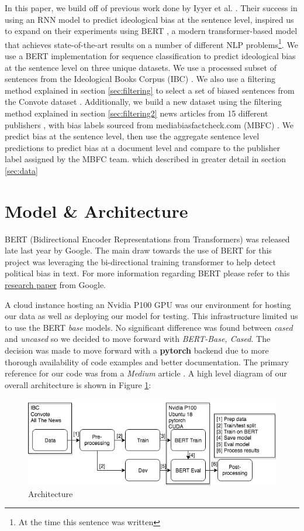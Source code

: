 \documentclass[10pt,a4paper,onecolumn]{article}
\begin{document}
In this paper, we build off of previous work done by Iyyer et al. \cite{iyyerRNN}. Their success in using an RNN model to predict ideological bias at the sentence level, inspired us to expand on their experiments using BERT \cite{bert}, a modern transformer-based model that achieves state-of-the-art results on a number of different NLP problems\footnote{At the time this sentence was written}. We use a BERT implementation for sequence classification to predict ideological bias at the sentence level on three unique datasets. We use a processed subset of sentences from the Ideological Books Corpus (IBC) \cite{gross2013ibc}. We also use a filtering method explained in section \ref{sec:filtering} to select a set of biased sentences from the Convote dataset \cite{convote}. Additionally, we build a new dataset using the filtering method explained in section \ref{sec:filtering2} news articles from 15 different publishers \cite{news}, with bias labels sourced from mediabiasfactcheck.com (MBFC) \cite{mbfc}. We predict bias at the sentence level, then use the aggregate sentence level predictions to predict bias at a document level and compare to the publisher label assigned by the MBFC team. which  described in greater detail in section \ref{sec:data}

\section{Model \& Architecture}
BERT (Bidirectional Encoder Representations from Transformers) was released late last year by Google. The main draw towards the use of BERT for this project was leveraging the bi-directional training transformer to help detect political bias in text. For more information regarding BERT please refer to this \href{https://arxiv.org/abs/1810.04805}{research paper} from Google.

A cloud instance hosting an Nvidia P100 GPU was our environment for hosting our data as well as deploying our model for testing. This infrastructure limited us to use the BERT \textit{base} models. No significant difference was found between \textit{cased} and \textit{uncased} so we decided to move forward with \textit{BERT-Base, Cased}. The decision was made to move forward with a \textbf{pytorch} backend due to more thorough availability of code examples and better documentation. The primary reference for our code was from a \textit{Medium} article \cite{usingbert}. A high level diagram of our overall architecture is shown in Figure \ref{fig:architecture}:
\begin{figure}
	\begin{center}
		\includegraphics[width=0.8\linewidth]{architecture.png}
		\caption{Architecture}
		\label{fig:architecture}
	\end{center}
\end{figure}
\end{document}
